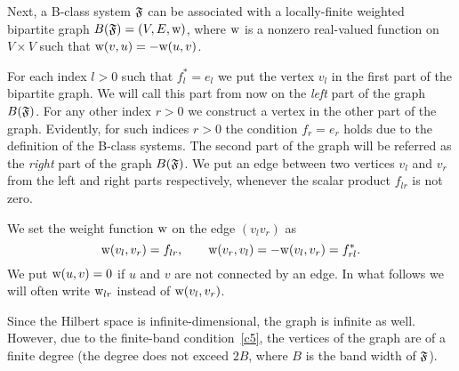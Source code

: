 \documentclass[12pt,oneside,a4paper]{amsart}
\begin{document}
    Next, a B-class system $\mathfrak{F}$ can be associated with a
      locally-finite weighted bipartite graph $B(\mathfrak{F}) = (V, E, \mathrm{w})$, where $\mathrm{w}$ is a
      nonzero real-valued function on $V\times V$ such that $\mathrm{w}(v, u) = -\mathrm{w}(u, v)$.

    For each index $l > 0$ such that $f^*_l = e_l$ we put the vertex $v_l$ in the first part of the bipartite graph.
    We will call this part from now on the \emph{left} part of the graph $B(\mathfrak{F})$.
    For any other index $r > 0$ we construct a vertex in the other part of the graph.
    Evidently, for such indices $r > 0$ the condition $f_r = e_r$ holds due to the definition of the B-class systems.
    The second part of the graph will be referred as the \emph{right} part of the graph $B(\mathfrak{F})$.
    We put an edge between two vertices $v_l$ and $v_r$ from the left and right parts respectively,
      whenever the scalar product $f_{lr}$ is not zero.

    We set the weight function $\mathrm{w}$ on the edge $(v_l v_r)$ as
    \begin{equation}
      \label{def-wt}
      \mathrm{w}(v_l, v_r) = f_{lr}, \qquad \mathrm{w}(v_r, v_l) = -\mathrm{w}(v_l, v_r) = f_{rl}^*.
    \end{equation}
    We put $\mathrm{w}(u, v) = 0$ if $u$ and $v$ are not connected by an edge.
    In what follows we will often write $\mathrm{w}_{lr}$ instead of $\mathrm{w}(v_l, v_r)$.

    Since the Hilbert space is infinite-dimensional, the graph is infinite as well.
    However, due to the finite-band condition~\ref{c5}, the vertices of the graph are of a finite degree (the degree does not
      exceed $2B$, where $B$ is the band width of $\mathfrak{F}$).
\end{document}
